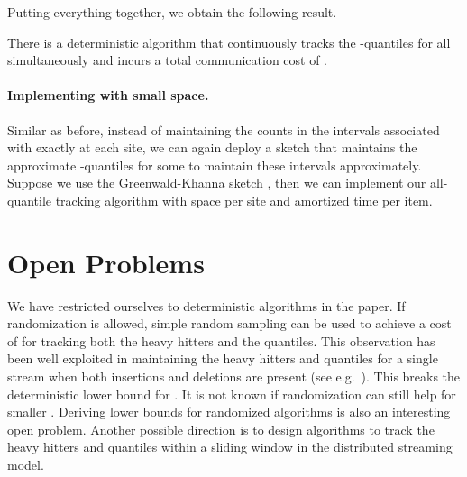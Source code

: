 \documentclass[10pt]{article}
\begin{document}
\smallskip Putting everything together, we obtain the following result.

\begin{theorem}
  There is a deterministic algorithm that continuously tracks the
  -quantiles for all  simultaneously and incurs a
  total communication cost of
  .
\end{theorem}

\paragraph{Implementing with small space.}
Similar as before, instead of maintaining the counts in the intervals
associated with  exactly at each site, we can again deploy a sketch
that maintains the approximate -quantiles for some
 to maintain these intervals approximately.  Suppose
we use the Greenwald-Khanna sketch \cite{greenwald01:_space}, then we can
implement our all-quantile tracking algorithm with  space per
site and amortized  time per item.


 
\section{Open Problems}
We have restricted ourselves to deterministic algorithms in the paper.  If
randomization is allowed, simple random sampling can be used to achieve a
cost of  for tracking both the
heavy hitters and the quantiles.  This observation has been well exploited
in maintaining the heavy hitters and quantiles for a single stream when
both insertions and deletions are present (see e.g.\
\cite{gilbert02:_how}).  This breaks the deterministic lower bound for
.  It is not known if randomization can still help for
smaller .  Deriving lower bounds for randomized algorithms is also an
interesting open problem.  Another possible direction is to design
algorithms to track the heavy hitters and quantiles within a sliding window
in the distributed streaming model.
\end{document}
